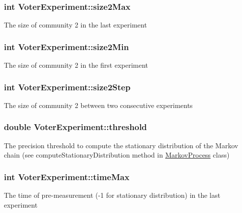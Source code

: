 \subsubsection[{size2\+Max}]{\setlength{\rightskip}{0pt plus 5cm}int Voter\+Experiment\+::size2\+Max}\label{class_voter_experiment_a5a0a8935b13623bb196fda30c8c5e0e0}
The size of community 2 in the last experiment \hypertarget{class_voter_experiment_aa4865f2c06bd9bfdf136536e7b4e2297}{}
\subsubsection[{size2\+Min}]{\setlength{\rightskip}{0pt plus 5cm}int Voter\+Experiment\+::size2\+Min}\label{class_voter_experiment_aa4865f2c06bd9bfdf136536e7b4e2297}
The size of community 2 in the first experiment \hypertarget{class_voter_experiment_a0c06dcb42e19c7879e1becc9b3d6a5df}{}
\subsubsection[{size2\+Step}]{\setlength{\rightskip}{0pt plus 5cm}int Voter\+Experiment\+::size2\+Step}\label{class_voter_experiment_a0c06dcb42e19c7879e1becc9b3d6a5df}
The size of community 2 between two consecutive experiments \hypertarget{class_voter_experiment_a03efdf4f20508ff7bcc6fd5c0e29a9c0}{}
\subsubsection[{threshold}]{\setlength{\rightskip}{0pt plus 5cm}double Voter\+Experiment\+::threshold}\label{class_voter_experiment_a03efdf4f20508ff7bcc6fd5c0e29a9c0}
The precision threshold to compute the stationary distribution of the Markov chain (see compute\+Stationary\+Distribution method in \hyperlink{class_markov_process}{Markov\+Process} class) \hypertarget{class_voter_experiment_ae02232a37adc28d878214b02ed23afd6}{}
\subsubsection[{time\+Max}]{\setlength{\rightskip}{0pt plus 5cm}int Voter\+Experiment\+::time\+Max}\label{class_voter_experiment_ae02232a37adc28d878214b02ed23afd6}
The time of pre-\/measurement (-\/1 for stationary distribution) in the last experiment \hypertarget{class_voter_experiment_aa27e26baf58fb885bf20bc437bbc8b04}{}
